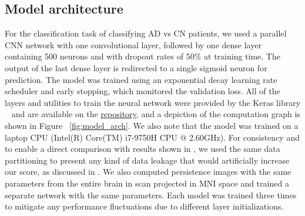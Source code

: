 \documentclass{article}
\begin{document}
\subsection{Model architecture}\label{sec:model_arch}
For the classification task of classifying AD vs CN patients, we used a parallel CNN network with
one convolutional layer, followed by one dense layer containing 500 neurons and with dropout rates
of 50\% at training time. The output of the last dense layer is redirected to a single sigmoid
neuron for prediction. The model was trained using an exponential decay learning rate scheduler and
early stopping, which monitored the validation loss. All of the layers and utilities to train the
neural network were provided by the Keras library ~\citep{chollet2015keras} and are available on the
\href{https://github.com/pjhartout/TDA_ADNI_MLCB}{repository}, and a depiction of the computation
graph is shown in Figure ~\ref{fig:model_arch}. We also note that the model was trained on a laptop
CPU (Intel(R) Core(TM) i7-9750H CPU @ 2.60GHz). For consistency and to enable a direct comparison
with results shown in \citep{bruningk2020image}, we used the same data partitioning to present any
kind of data leakage that would artificially increase our score, as discussed in
\citet{wen2020convolutional}. We also computed persistence images with the same parameters from the
entire brain in scan projected in MNI space and trained a separate network with the same parameters.
Each model was trained three times to mitigate any performance fluctuations due to different layer
initializations.
\end{document}
